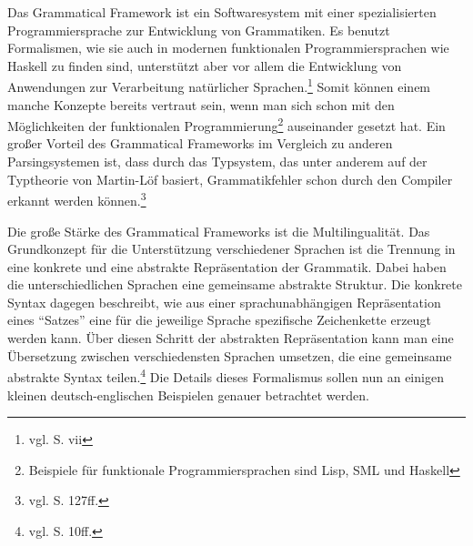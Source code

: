 Das Grammatical Framework ist ein Softwaresystem mit einer spezialisierten Programmiersprache zur Entwicklung von Grammatiken. Es benutzt Formalismen, wie sie auch in modernen funktionalen Programmiersprachen wie Haskell zu finden sind, unterstützt aber vor allem die Entwicklung von Anwendungen zur Verarbeitung natürlicher Sprachen.\footnote{vgl. \cite{RANTA2011} S. vii} Somit können einem manche Konzepte bereits vertraut sein, wenn man sich schon mit den Möglichkeiten der funktionalen Programmierung\footnote{Beispiele für funktionale Programmiersprachen sind Lisp, SML und Haskell} auseinander gesetzt hat. Ein großer Vorteil des Grammatical Frameworks im Vergleich zu anderen Parsingsystemen ist, dass durch das Typsystem, das unter anderem auf der Typtheorie von Martin-Löf basiert, Grammatikfehler schon durch den Compiler erkannt werden können.\footnote{vgl. \cite{RANTA2011} S. 127ff.} \par
Die große Stärke des Grammatical Frameworks ist die Multilingualität. Das Grundkonzept für die Unterstützung verschiedener Sprachen ist die Trennung in eine konkrete und eine abstrakte Repräsentation der Grammatik. Dabei haben die unterschiedlichen Sprachen eine gemeinsame abstrakte Struktur. Die konkrete Syntax dagegen beschreibt, wie aus einer sprachunabhängigen Repräsentation eines "`Satzes"' eine für die jeweilige Sprache spezifische Zeichenkette erzeugt werden kann. Über diesen Schritt der abstrakten Repräsentation kann man eine Übersetzung zwischen verschiedensten Sprachen umsetzen, die eine gemeinsame abstrakte Syntax teilen.\footnote{vgl. \cite{RANTA2011} S. 10ff.} Die Details dieses Formalismus sollen nun an einigen kleinen deutsch-englischen Beispielen genauer betrachtet werden.
\pagebreak
